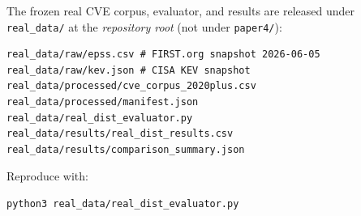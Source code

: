 The frozen real CVE corpus, evaluator, and results are released under
\texttt{real\_data/} at the \emph{repository root} (not under
\texttt{paper4/}):
{\small{\footnotesize\begin{verbatim}
real_data/raw/epss.csv # FIRST.org snapshot 2026-06-05
real_data/raw/kev.json # CISA KEV snapshot
real_data/processed/cve_corpus_2020plus.csv
real_data/processed/manifest.json
real_data/real_dist_evaluator.py
real_data/results/real_dist_results.csv
real_data/results/comparison_summary.json
\end{verbatim}}}
\noindent
Reproduce with:
{\small{\footnotesize\begin{verbatim}
python3 real_data/real_dist_evaluator.py
\end{verbatim}}}
